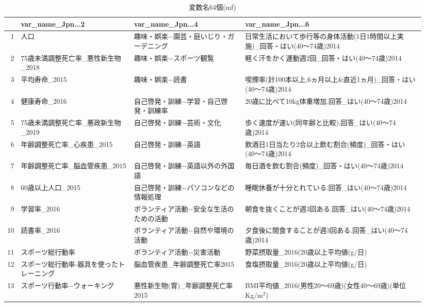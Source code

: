 \begin{table}[ht]
\centering
\caption{変数名64個(mf)}
\label{table_mf_d.tex}
\begingroup\tiny

\begin{adjustbox}{width=.5\textwidth}
\begin{tabular}{rlll}
  \hline
 & var\_name\_Jpn...2 & var\_name\_Jpn...4 & var\_name\_Jpn...6 \\
  \hline
1 & 人口 & 趣味・娯楽−園芸・庭いじり・ガーデニング & 日常生活において歩行等の身体活動(1日1時間以上実施)\_回答・はい(40〜74歳)2014 \\
  2 & 75歳未満調整死亡率\_悪性新生物\_2018 & 趣味・娯楽−スポーツ観覧 & 軽く汗をかく運動週2回\_回答・はい(40〜74歳)2014 \\
  3 & 平均寿命\_2015 & 趣味・娯楽−読書 & 喫煙率(計100本以上,6ヵ月以上\&直近1ヵ月)\_回答・はい(40〜74歳)2014 \\
  4 & 健康寿命\_2016 & 自己啓発・訓練−学習・自己啓発・訓練率 & 20歳に比べて10kg体重増加.回答\_はい(40〜74歳)2014 \\
  5 & 75歳未満調整死亡率\_悪政新生物\_2019 & 自己啓発・訓練−芸術・文化 & 歩く速度が速い(同年齢と比較).回答\_はい(40〜74歳)2014 \\
  6 & 年齢調整死亡率\_心疾患\_2015 & 自己啓発・訓練−英語 & 飲酒日1日当たり2合以上飲む割合(頻度)\_回答・はい(40〜74歳)2014 \\
  7 & 年齢調整死亡率\_脳血管疾患\_2015 & 自己啓発・訓練−英語以外の外国語 & 毎日酒を飲む割合(頻度)\_回答・はい(40〜74歳)2014 \\
  8 & 60歳以上人口\_2015 & 自己啓発・訓練−パソコンなどの情報処理 & 睡眠休養が十分とれている.回答\_はい(40〜74歳)2014 \\
  9 & 学習率\_2016 & ボランティア活動−安全な生活のための活動 & 朝食を抜くことが週3回ある.回答\_はい(40〜74歳)2014 \\
  10 & 読書率\_2016 & ボランティア活動−自然や環境の活動 & 夕食後に間食することが週3回ある.回答\_はい(40〜74歳)2014 \\
  11 & スポーツ総行動率 & ボランティア活動−災害活動 & 野菜摂取量\_2016(20歳以上平均値(g/日) \\
  12 & スポーツ総行動率-器具を使ったトレーニング & 脳血管疾患\_年齢調整死亡率2015 & 食塩摂取量\_2016(20歳以上平均値(g/日) \\
  13 & スポーツ行動率−ウォーキング & 悪性新生物(胃)\_年齢調整死亡率2015 & BMI平均値\_2016(男性20〜69歳)(女性40〜69歳)(単位Kg/m$^2$) \\

\end{tabular}
\end{adjustbox}
\end{table}
